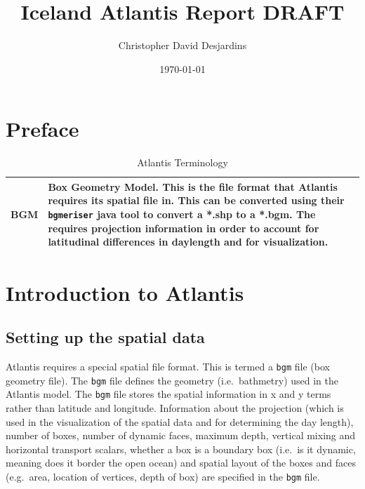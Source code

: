 \documentclass{report}
\begin{document}
\title{Iceland Atlantis Report DRAFT}
\author{Christopher David Desjardins}
\date{\today}
\maketitle
\newpage

\tableofcontents
\newpage

\chapter{Preface}

\begin{table}[!htbp]
\caption{Atlantis Terminology}
\begin{tabular}{lp{10cm}}
\hline
BGM & Box Geometry Model. This is the file format that Atlantis requires its spatial file in. This can be converted using their \texttt{bgmeriser} java tool to convert a *.shp to a *.bgm. The requires projection information in order to account for latitudinal differences in daylength and for visualization. \\
\hline
\end{tabular}
\end{table}


\chapter{Introduction to Atlantis}

\newpage
\section{Setting up the spatial data}

Atlantis requires a special spatial file format. This is termed a \texttt{bgm} file (box geometry file). The \texttt{bgm} file defines the geometry (i.e.\ bathmetry) used in the Atlantis model. The \texttt{bgm} file stores the spatial information in x and y terms rather than latitude and longitude. Information about the projection (which is used in the visualization of the spatial data and for determining the day length), number of boxes, number of dynamic faces, maximum depth, vertical mixing and horizontal transport scalars, whether a box is a boundary box (i.e.\ is it dynamic, meaning does it border the open ocean) and spatial layout of the boxes and faces (e.g.\ area, location of vertices, depth of box) are specified in the \texttt{bgm} file. 
\end{document}

